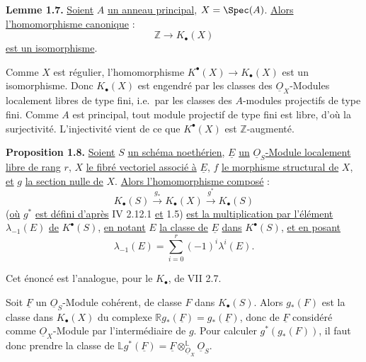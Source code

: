 
\textbf{Lemme 1.7.} \uline{Soient} $A$ \uline{un anneau principal}, $X=\Spec(A)$. \uline{Alors l'homomorphisme canonique} :
\[
\mathbb Z\longrightarrow K_\bullet(X)
\]
\uline{est un isomorphisme}.

Comme $X$ est régulier, l'homomorphisme $K^{\bullet}(X)\to K_\bullet(X)$ est un isomorphisme. Donc $K_\bullet(X)$ est engendré par les classes des $\underline{O}_X$-Modules localement libres de type fini, i.e.\ par les classes des $A$-modules projectifs de type fini. Comme $A$ est principal, tout module projectif de type fini est libre, d'où la surjectivité. L'injectivité vient de ce que $K^{\bullet}(X)$ est $\mathbb Z$-augmenté.

\textbf{Proposition 1.8.} \uline{Soient} $S$ \uline{un schéma noethérien}, $\underline{E}$ \uline{un} $\underline{O}_S$\uline{-Module localement libre de rang} $r$, $X$ \uline{le fibré vectoriel associé à} $\underline{E}$, $f$ \uline{le morphisme structural de} $X$, \uline{et} $g$ \uline{la section nulle de} $X$. \uline{Alors l'homomorphisme composé} :
\[
K_\bullet(S)\xrightarrow{g_*}K_\bullet(X)\xrightarrow{g^*}K_\bullet(S)
\]
(\uline{où} $g^*$ \uline{est défini d'après} IV 2.12.1 \uline{et} 1.5) \uline{est la multiplication par l'élément} $\lambda_{-1}(E)$ \uline{de} $K^{\bullet}(S)$, \uline{en notant} $E$ \uline{la classe de} $\underline{E}$ \uline{dans} $K^{\bullet}(S)$, \uline{et en posant}
\[
\lambda_{-1}(E)=\sum_{i=0}^r(-1)^i\lambda^i(E).
\]

Cet énoncé est l'analogue, pour le $K_\bullet$, de VII 2.7.

Soit $\underline{F}$ un $\underline{O}_S$-Module cohérent, de classe $F$ dans $K_\bullet(S)$. Alors $g_*(F)$ est la classe dans $K_\bullet(X)$ du complexe $\mathbb Rg_*(\underline{F})=g_*(\underline{F})$, donc de $\underline{F}$ considéré comme $\underline{O}_X$-Module par l'intermédiaire de $g$. Pour calculer $g^*(g_*(F))$, il faut donc prendre la classe de \(\mathbb Lg^*(\underline{F})=\underline{F}\otimes^{\mathbb L}_{\underline{O}_X}\underline{O}_S\).

